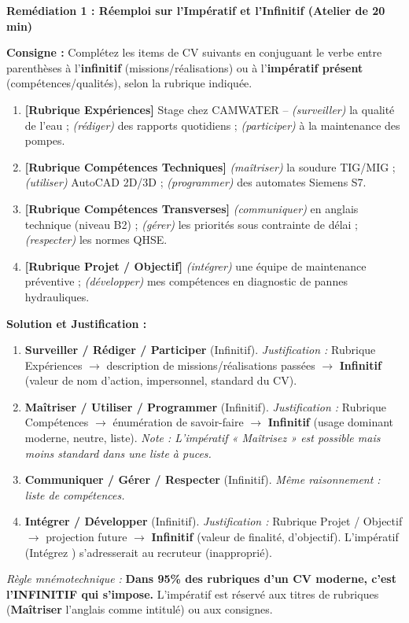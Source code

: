 \documentclass[11pt]{article}
\begin{document}
\textbf{Remédiation 1 : Réemploi sur l'Impératif et l'Infinitif (Atelier de 20 min)}

\begin{exoresolu}
\textbf{Consigne :} Complétez les items de CV suivants en conjuguant le verbe entre parenthèses à l'\textbf{infinitif} (missions/réalisations) ou à l'\textbf{impératif présent} (compétences/qualités), selon la rubrique indiquée.
\begin{enumerate}
    \item \textbf{[Rubrique Expériences]} Stage chez CAMWATER -- \textit{(surveiller)} la qualité de l'eau ; \textit{(rédiger)} des rapports quotidiens ; \textit{(participer)} à la maintenance des pompes.
    \item \textbf{[Rubrique Compétences Techniques]} \textit{(maîtriser)} la soudure TIG/MIG ; \textit{(utiliser)} AutoCAD 2D/3D ; \textit{(programmer)} des automates Siemens S7.
    \item \textbf{[Rubrique Compétences Transverses]} \textit{(communiquer)} en anglais technique (niveau B2) ; \textit{(gérer)} les priorités sous contrainte de délai ; \textit{(respecter)} les normes QHSE.
    \item \textbf{[Rubrique Projet / Objectif]} \textit{(intégrer)} une équipe de maintenance préventive ; \textit{(développer)} mes compétences en diagnostic de pannes hydrauliques.
\end{enumerate}
\tcblower
\textbf{Solution et Justification :}
\begin{enumerate}
    \item \textbf{Surveiller / Rédiger / Participer} (Infinitif). \emph{Justification :} Rubrique \guillemotleft Expériences \guillemotright $\rightarrow$ description de missions/réalisations passées $\rightarrow$ \textbf{Infinitif} (valeur de nom d'action, impersonnel, standard du CV).
    \item \textbf{Maîtriser / Utiliser / Programmer} (Infinitif). \emph{Justification :} Rubrique \guillemotleft Compétences \guillemotright $\rightarrow$ énumération de savoir-faire $\rightarrow$ \textbf{Infinitif} (usage dominant moderne, neutre, liste). \textit{Note : L'impératif « Maîtrisez » est possible mais moins standard dans une liste à puces.}
    \item \textbf{Communiquer / Gérer / Respecter} (Infinitif). \emph{Même raisonnement : liste de compétences.}
    \item \textbf{Intégrer / Développer} (Infinitif). \emph{Justification :} Rubrique \guillemotleft Projet / Objectif \guillemotright $\rightarrow$ projection future $\rightarrow$ \textbf{Infinitif} (valeur de finalité, d'objectif). L'impératif (\guillemotleft Intégrez \guillemotright) s'adresserait au recruteur (inapproprié).
\end{enumerate}
\emph{Règle mnémotechnique :} \textbf{Dans 95\% des rubriques d'un CV moderne, c'est l'INFINITIF qui s'impose.} L'impératif est réservé aux titres de rubriques (\guillemotleft \textbf{Maîtriser} l'anglais \guillemotright comme intitulé) ou aux consignes.
\end{exoresolu}
\end{document}
